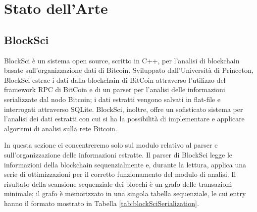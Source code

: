 \chapter{Stato dell'Arte}\label{chap:riferimentiStrotici}


\section{BlockSci} \label{sec:riferimentiStorici}

BlockSci \cite{blocksci:article} è un sistema open source, scritto in C++, per l'analisi di blockchain basate sull'organizzazione dati di Bitcoin. Sviluppato dall'Università di Princeton, BlockSci estrae i dati dalla blockchain di BitCoin attraverso l'utilizzo del framework RPC di BitCoin e di un parser per l'analisi delle informazioni serializzate dal nodo Bitcoin; i dati estratti vengono salvati in flat-file e interrogati attraverso SQLite.
BlockSci, inoltre, offre un sofisticato sistema per l'analisi dei dati estratti con cui si ha la possibilità di implementare e applicare algoritmi di analisi sulla rete Bitcoin.

In questa sezione ci concentreremo  solo sul modulo relativo al parser e sull'organizzazione delle informazioni estratte. Il parser di BlockSci legge le informazioni della blockchain sequenzialmente e, durante la lettura, applica  una serie di ottimizzazioni per il corretto funzionamento del modulo di analisi.
Il risultato della scansione sequenziale dei blocchi è un grafo delle transazioni minimale; il grafo è memorizzato in una singola tabella sequenziale, le cui entry hanno il formato mostrato in Tabella \ref{tab:blockSciSerialization}.

